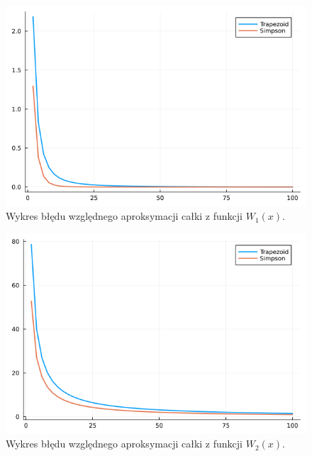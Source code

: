 \documentclass{article}
\theoremstyle{definition}
\begin{document}
\begin{figure}[h!]
    \centering
    \includegraphics[scale=0.5]{plot_W1.png}
    \caption{Wykres błędu względnego aproksymacji całki z funkcji \(W_1(x)\).}
    \label{fig:plot_W1}
\end{figure}


\begin{figure}[h!]
    \centering
    \includegraphics[scale=0.5]{plot_W2.png}
    \caption{Wykres błędu względnego aproksymacji całki z funkcji \(W_2(x)\).}
    \label{fig:plot_W2}
\end{figure}
\end{document}
